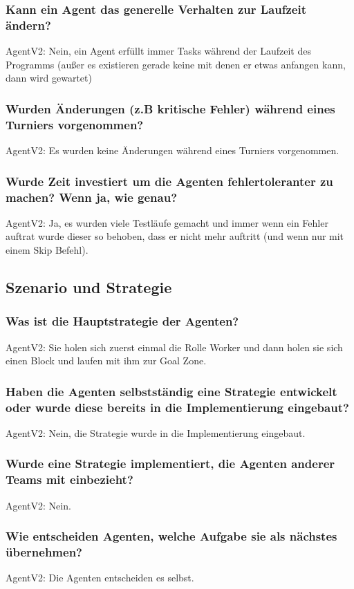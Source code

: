 \documentclass[runningheads]{llncs}
\begin{document}
\subsubsection{Kann ein Agent das generelle Verhalten zur Laufzeit ändern?\\}
AgentV2: Nein, ein Agent erfüllt immer Tasks während der Laufzeit des Programms (außer es existieren gerade keine mit denen er etwas anfangen kann, dann wird gewartet)
\subsubsection{Wurden Änderungen (z.B kritische Fehler) während eines Turniers vorgenommen?\\}
AgentV2: Es wurden keine Änderungen während eines Turniers vorgenommen.
\subsubsection{Wurde Zeit investiert um die Agenten fehlertoleranter zu machen? Wenn ja, wie genau?\\}
AgentV2: Ja, es wurden viele Testläufe gemacht und immer wenn ein Fehler auftrat wurde dieser so behoben, dass er nicht mehr auftritt (und wenn nur mit einem Skip Befehl).
\subsection{Szenario und Strategie}
\subsubsection{Was ist die Hauptstrategie der Agenten?\\}
AgentV2: Sie holen sich zuerst einmal die Rolle Worker und dann holen sie sich einen Block und laufen mit ihm zur Goal Zone.
\subsubsection{Haben die Agenten selbstständig eine Strategie entwickelt oder wurde diese bereits in die Implementierung eingebaut?\\}
AgentV2: Nein, die Strategie wurde in die Implementierung eingebaut.
\subsubsection{Wurde eine Strategie implementiert, die Agenten anderer Teams mit einbezieht?\\}
AgentV2: Nein.
\subsubsection{Wie entscheiden Agenten, welche Aufgabe sie als nächstes übernehmen?\\}
AgentV2: Die Agenten entscheiden es selbst.
\end{document}
